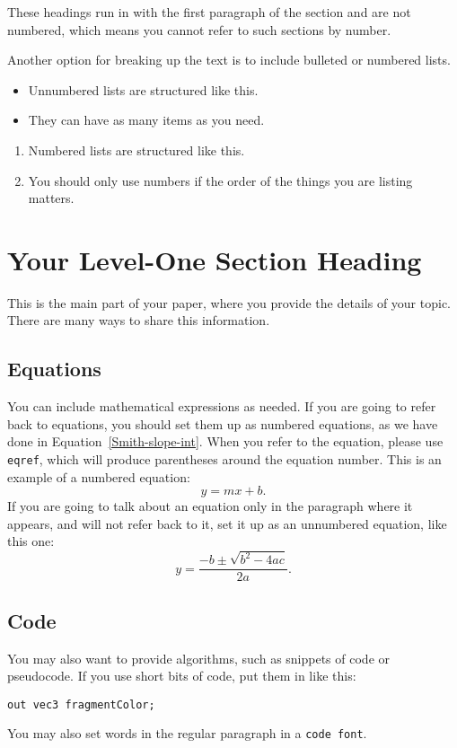 These headings run in with the first paragraph of the section and are not numbered, which means you cannot
refer to such sections by number.

Another option for breaking up the text is to include bulleted or numbered lists.
\begin{itemize}
 \item Unnumbered lists are structured like this.
 \item They can have as many items as you need.
\end{itemize}

\begin{enumerate}
 \item Numbered lists are structured like this.
 \item You should only use numbers if the order of the things you are listing matters.
\end{enumerate}


\section{Your Level-One Section Heading}

This is the main part of your paper, where you provide the details of your topic. There are many ways to share this information.

\subsection{Equations}
You can include mathematical expressions as needed. If you are going to refer back to equations, you should set them up as numbered equations, as we have done in Equation~\eqref{Smith-slope-int}. When you refer to the equation, please use \texttt{eqref}, which will produce parentheses around the equation number. This is an example of a numbered equation:
\begin{equation}\label{Smith-slope-int}
y=mx+b.
\end{equation}
If you are going to talk about an equation only in the paragraph where it appears, and will not refer back to it, set it up as an unnumbered equation, like this one:
$$
y = \frac{-b \pm \sqrt{b^2 - 4ac}}{2a}.
$$

\subsection{Code}
You may also want to provide algorithms, such as snippets of code or pseudocode. If you use short bits of code, put them in like this:
\begin{verbatim}
out vec3 fragmentColor;
\end{verbatim}
You may also set words in the regular paragraph in a \texttt{code font}.

